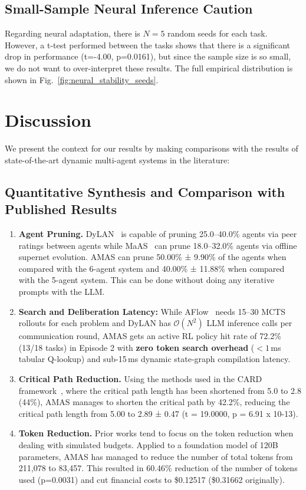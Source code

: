 \documentclass[conference]{IEEEtran}
\begin{document}
\subsection{Small-Sample Neural Inference Caution}
Regarding neural adaptation, there is $N = 5$ random seeds for each task. However, a t-test performed between the tasks shows that there is a significant drop in performance (t=-4.00, p=0.0161), but since the sample size is so small, we do not want to over-interpret these results. The full empirical distribution is shown in Fig.~\ref{fig:neural_stability_seeds}.

\section{Discussion}
\label{sec:discussion}

We present the context for our results by making comparisons with the results of state-of-the-art dynamic multi-agent systems in the literature:
\subsection{Quantitative Synthesis and Comparison with Published Results}
\begin{enumerate}[leftmargin=*]
\item \textbf{Agent Pruning.} DyLAN~\cite{liu2024dylan} is capable of pruning 25.0--40.0\% agents via peer ratings between agents while MaAS~\cite{Zhang2025MaAS} can prune 18.0--32.0\% agents via offline supernet evolution. AMAS can prune 50.00\% ± 9.90\% of the agents when compared with the 6-agent system and 40.00\% ± 11.88\% when compared with the 5-agent system. This can be done without doing any iterative prompts with the LLM.

 \item \textbf{Search and Deliberation Latency:} While AFlow~\cite{zhang2024aflow} needs 15--30 MCTS rollouts for each problem and DyLAN has $\mathcal{O}(N^2)$ LLM inference calls per communication round, AMAS gets an active RL policy hit rate of 72.2\% (13/18 tasks) in Episode 2 with \textbf{zero token search overhead} ($<1$\,ms tabular Q-lookup) and sub-15\,ms dynamic state-graph compilation latency.
 
\item \textbf{Critical Path Reduction.} Using the methods used in the CARD framework~\cite{Li2025AdaptiveGraphPruning}, where the critical path length has been shortened from 5.0 to 2.8 (44\%), AMAS manages to shorten the critical path by 42.2\%, reducing the critical path length from 5.00 to 2.89 ± 0.47 (t = 19.0000, p = 6.91 x 10-13).
\item \textbf{Token Reduction.} Prior works tend to focus on the token reduction when dealing with simulated budgets. Applied to a foundation model of 120B parameters, AMAS has managed to reduce the number of total tokens from 211,078 to 83,457. This resulted in 60.46\% reduction of the number of tokens used (p=0.0031) and cut financial costs to \$0.12517 (\$0.31662 originally).
\end{enumerate}
\end{document}
